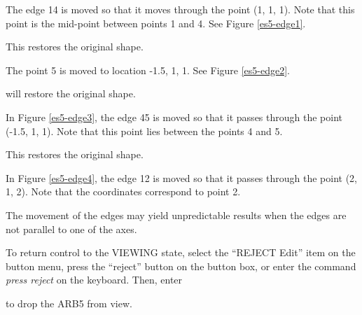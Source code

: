 The edge 14 is moved so that it moves through the point (1, 1, 1).
Note that this point is the mid-point between points 1 and 4.
See Figure \ref{es5-edge1}.


This restores the original shape.


The point 5 is moved to location -1.5, 1, 1.  See Figure \ref{es5-edge2}.


will restore the original shape.


In Figure \ref{es5-edge3}, the edge 45 is moved
so that it passes through the point (-1.5, 1, 1).
Note that this point lies between the points 4 and 5.


This restores the original shape.


In Figure \ref{es5-edge4},
the edge 12 is moved so that it passes through the point (2, 1, 2).
Note that the coordinates correspond to point 2.

The movement of the edges may yield unpredictable results when the edges
are not parallel to one of the axes.


To return control to the VIEWING state, select the ``REJECT Edit''
item on the button menu, press the ``reject'' button on the button box,
or enter the command {\em press reject} on the keyboard.
Then, enter


to drop the ARB5 from view.

